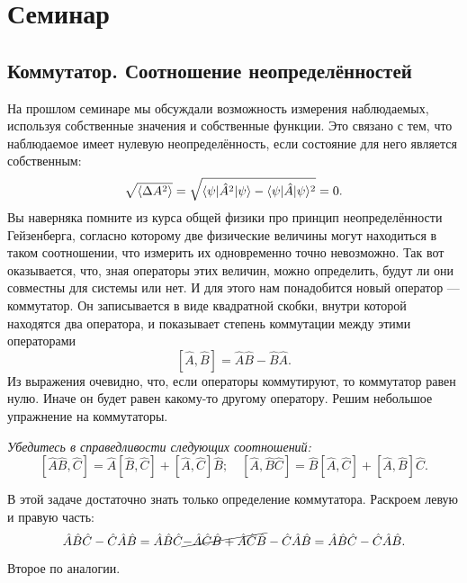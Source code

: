 \section{Семинар \thesection}

\subsection{Коммутатор. Соотношение неопределённостей}
На прошлом семинаре мы обсуждали возможность измерения наблюдаемых, используя
собственные значения и собственные функции. Это связано с тем, что наблюдаемое
имеет нулевую неопределённость, если состояние для него является собственным:
\[
  \sqrt{\langle \Delta A^2 \rangle} = \sqrt{\langle\psi\rvert\hat{A}^2\lvert\psi\rangle - \langle\psi\rvert\hat{A}\lvert\psi\rangle^2} = 0.
\]
Вы наверняка помните из курса общей физики про принцип неопределённости
Гейзенберга, согласно которому две физические величины могут находиться в таком
соотношении, что измерить их одновременно точно невозможно. Так вот
оказывается, что, зная операторы этих величин, можно определить, будут ли они
совместны для системы или нет. И для этого нам понадобится новый оператор ---
коммутатор. Он записывается в виде квадратной скобки, внутри которой находятся
два оператора, и показывает степень коммутации между этими операторами
\[
  [\hat{A}, \hat{B}] = \hat{A}\hat{B} - \hat{B}\hat{A}.
\]
Из выражения очевидно, что, если операторы коммутируют, то коммутатор равен
нулю. Иначе он будет равен какому-то другому оператору. Решим небольшое
упражнение на коммутаторы.
\begin{exercise}\label{ex:commutator-product}
  \textit{Убедитесь в справедливости следующих соотношений:}
  \[
    [\hat A \hat B, \hat C] = \hat A [\hat B, \hat C] + [\hat A, \hat C]\hat B;
    \quad [\hat A, \hat B \hat C] = \hat B [\hat A, \hat C] + [\hat A, \hat B] \hat C.
  \]
\end{exercise}

В этой задаче достаточно знать только определение коммутатора. Раскроем левую и
правую часть:
\[
  \hat A \hat B \hat C - \hat C \hat A \hat B = \hat A \hat B \hat C
  \cancel{- \hat A \hat C \hat B + \hat A \hat C \hat B} - \hat C \hat A \hat B =
  \hat A \hat B \hat C - \hat C \hat A \hat B.
\]
Второе по аналогии.
\qedsq

